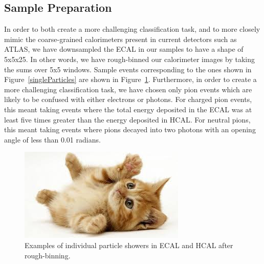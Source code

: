 \documentclass{article}
\begin{document}
    \subsection*{Sample Preparation}

    In order to both create a more challenging classification task, and to more closely mimic the coarse-grained calorimeters present in current detectors such as ATLAS, we have downsampled the ECAL in our samples to have a shape of 5x5x25. In other words, we have rough-binned our calorimeter images by taking the sums over 5x5 windows. Sample events corresponding to the ones shown in Figure~\ref{singleParticles} are shown in Figure~\ref{singleParticlesRough}. Furthermore, in order to create a more challenging classification task, we have chosen only pion events which are likely to be confused with either electrons or photons. For charged pion events, this meant taking events where the total energy deposited in the ECAL was at least five times greater than the energy deposited in HCAL. For neutral pions, this meant taking events where pions decayed into two photons with an opening angle of less than 0.01 radians.

    \begin{figure}
        \begin{center}
            \includegraphics{images/cat-thumb.jpeg}
        \end{center}
        \caption{Examples of individual particle showers in ECAL and HCAL after rough-binning.}
        \label{singleParticlesRough}
    \end{figure}
\end{document}
